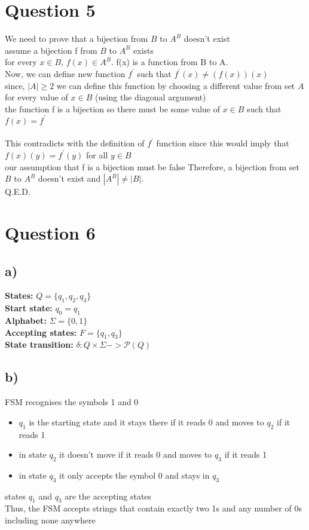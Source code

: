 \documentclass[11pt]{article}
\begin{document}
\section*{Question 5}
We need to prove that a bijection from $B$ to $A^B$ doesn't exist \\
assume a bijection f from $B$ to $A^B$ exists \\
for every $x \in B$, $f(x) \in A^B$. f(x) is a function from B to A. \\
Now, we can define new function $f^\prime$ such that
$f^\prime (x) \neq (f(x))(x)$ \\
since, $|A| \geq 2$ we can define this function by choosing a different value from set
$A$ for every value of $x \in B$ (using the diagonal argument) \\
the function f is a bijection so there must be some value of $x \in B$ such that
$f(x) = f^\prime$ \\
\\
This contradicts with the definition of $f^\prime$ function since this would imply
that $f(x)(y) = f^\prime(y)$ for all $y \in B$ \\
our assumption that f is a bijection must be false
Therefore, a bijection from set $B$ to $A^B$ doesn't exist and $|A^B| \neq |B|$. \\
Q.E.D.

\section*{Question 6}
\subsection*{a)}
\textbf{States:} $Q = \{q_1, q_2, q_3\}$ \\
\textbf{Start state:} $q_0 = q_1$ \\
\textbf{Alphabet:} $\Sigma = \{0, 1\}$ \\
\textbf{Accepting states:} $F = \{q_1, q_3\}$ \\
\textbf{State transition:} $\delta : Q \times \Sigma -> \mathcal{P}(Q)$ \\

\subsection*{b)}
FSM recognises the symbols 1 and 0
\begin{itemize}
    \item $q_1$ is the starting state and it stays there if it reads 0 and moves to $q_2$ if it reads 1
    \item in state $q_2$ it doesn't move if it reads 0 and moves to $q_3$ if it reads 1
    \item in state $q_3$ it only accepts the symbol 0 and stays in $q_3$
\end{itemize}
states $q_1$ and $q_3$ are the accepting states \\
Thus, the FSM accepts strings that contain exactly two 1s and any number of 0s including none anywhere
\end{document}
